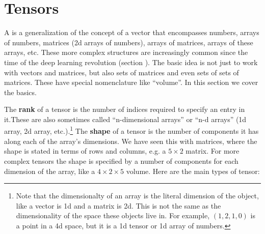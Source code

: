 
\section{Tensors}\label{sect_tensors}


A  is a generalization of the concept of a vector that encompasses numbers, arrays of numbers, matrices (2d arrays of numbers), arrays of matrices, arrays of these arrays, etc. These more complex structures are increasingly common since the time of the deep learning revolution (section ). The basic idea is not just to work with vectors and matrices, but also sets of matrices and even sets of sets of matrices. These have special nomenclature like ``volume''. In this section we cover the basics.

The \textbf{rank} of a  tensor is the number of indices required to specify an entry in it.These are also sometimes called ``n-dimensional arrays'' or ``n-d arrays'' (1d array, 2d array, etc.).\footnote{Note that the dimensionalty of an array is the literal dimension of the object, like a vector is 1d and a matrix is 2d. This is not the same as the dimensionality of the space these objects live in. For example, $(1,2,1,0)$ is a point in a 4d space, but it is a 1d tensor or 1d array of numbers.} The \textbf{shape} of a tensor is the number of components it has along each of the array's dimensions. We have seen this with matrices, where the shape is stated in terms of rows and columns, e.g. a $5 \times 2$ matrix. For more complex tensors the shape is specified by a number of components for each dimension of the array, like a $4 \times 2 \times 5$ volume. Here are the main types of tensor:

